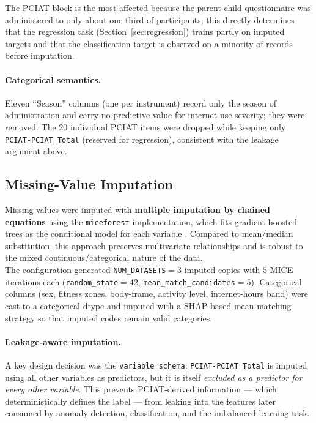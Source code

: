 The PCIAT block is the most affected because the parent-child questionnaire was administered to only about one third of participants; this directly determines that the regression task (Section~\ref{sec:regression}) trains partly on imputed targets and that the classification target is observed on a minority of records before imputation.

\paragraph{Categorical semantics.} Eleven ``Season'' columns (one per instrument) record only the season of administration and carry no predictive value for internet-use severity; they were removed. The 20 individual PCIAT items were dropped while keeping only \texttt{PCIAT-PCIAT\_Total} (reserved for regression), consistent with the leakage argument above.

\subsection{Missing-Value Imputation}
\label{sec:mice}
Missing values were imputed with \textbf{multiple imputation by chained equations} using the \texttt{miceforest} implementation, which fits gradient-boosted trees as the conditional model for each variable \cite{miceforest,vanbuuren}. Compared to mean/median substitution, this approach preserves multivariate relationships and is robust to the mixed continuous/categorical nature of the data.\\

The configuration generated \texttt{NUM\_DATASETS}$=3$ imputed copies with $5$ MICE iterations each (\texttt{random\_state}$=42$, \texttt{mean\_match\_candidates}$=5$). Categorical columns (sex, fitness zones, body-frame, activity level, internet-hours band) were cast to a categorical dtype and imputed with a SHAP-based mean-matching strategy so that imputed codes remain valid categories.\\

\paragraph{Leakage-aware imputation.} A key design decision was the \texttt{variable\_schema}: \texttt{PCIAT-PCIAT\_Total} is imputed using all other variables as predictors, but it is itself \emph{excluded as a predictor for every other variable}. This prevents PCIAT-derived information --- which deterministically defines the label --- from leaking into the features later consumed by anomaly detection, classification, and the imbalanced-learning task.\\

